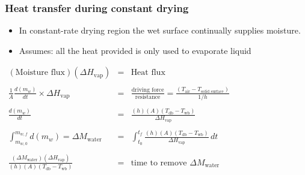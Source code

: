 \begin{frame}\frametitle{Heat transfer during constant drying}
	\begin{itemize}
		\item	In constant-rate drying region the wet surface continually supplies moisture.
		\item	{\color{myOrange}Assumes}: all the heat provided is only used to evaporate liquid
	\end{itemize}
	\vspace{12pt}
	$\begin{array}{rcl}
		(\text{Moisture flux})(\Delta H_\text{vap})  							&=& \text{Heat flux}\\
		\\
		\displaystyle\frac{1}{A} \frac{d(m_w)}{dt} \times \Delta H_\text{vap} 	&=& \displaystyle\frac{\text{driving force}}{\text{resistance}} = \displaystyle\frac{(T_\text{air} - T_\text{solid surface}) }{1/h} \\
		\\
		\displaystyle \frac{d(m_w)}{dt}   										&=& \displaystyle\frac{(h)(A)(T_\text{db} - T_\text{wb})}{\Delta H_\text{vap}}  \\
		\\
		\displaystyle \int_{m_{w,0}}^{m_{w,f}}{d(m_w)} = \Delta M_\text{water}	&=& \displaystyle \int_{t_0}^{t_f}{\frac{(h)(A)(T_\text{db} - T_\text{wb})}{\Delta H_\text{vap}}\, dt} \\
		\\
		\displaystyle  \frac{(\Delta M_\text{water}) (\Delta H_\text{vap})}{(h)(A)(T_\text{db} - T_\text{wb})} &=& \text{time to remove $\Delta M_\text{water}$}
	\end{array}$
\end{frame}

